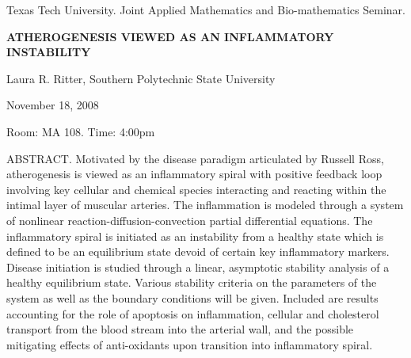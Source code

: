 \documentclass[oneside]{amsart}
\begin{document}
\begin{center}
Texas Tech University. Joint Applied Mathematics and Bio-mathematics Seminar.

\end{center}

\begin{center}

{\LARGE \uppercase{\textbf
{Atherogenesis viewed as an inflammatory instability}}}

Laura R. Ritter, Southern Polytechnic State University

November 18, 2008

Room: MA 108. Time: 4:00pm

\end{center}

ABSTRACT.
Motivated by the disease paradigm articulated by Russell Ross, atherogenesis is viewed as an inflammatory spiral with positive feedback loop involving key cellular and chemical species interacting and reacting within the intimal layer of muscular arteries. The inflammation is modeled through a system of nonlinear reaction-diffusion-convection partial differential equations. The inflammatory spiral is initiated as an instability from a healthy state which is defined to be an equilibrium state devoid of certain key inflammatory markers. Disease initiation is studied through a linear, asymptotic stability analysis of a healthy equilibrium state. Various stability criteria on the parameters of the system as well as the boundary conditions will be given. Included are results accounting for the role of apoptosis on inflammation, cellular and cholesterol transport from the blood stream into the arterial wall, and the possible mitigating effects of anti-oxidants upon transition into inflammatory spiral.
\end{document}
